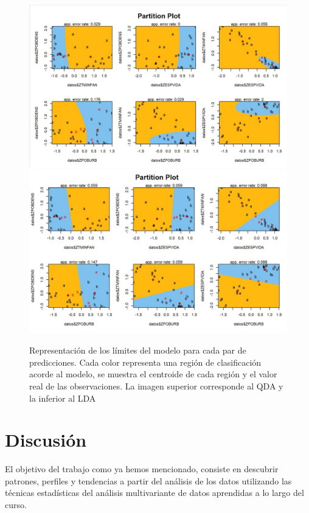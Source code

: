\documentclass[11pt,a4paper]{article}
\begin{document}
        \begin{figure}[H]
            \centering
            \includegraphics[scale=1]{img2.jpg}
            \includegraphics[scale=1]{img3.jpg}
            \caption{Representación de los límites del modelo para cada par de predicciones. Cada color representa una región de clasificación acorde al modelo, se muestra el centroide de cada región y el valor real de las observaciones. La imagen superior corresponde al QDA y la inferior al LDA }
            \label{img2}
        \end{figure}
        
    


        


	
	\section{Discusión}
	
    El objetivo del trabajo como ya hemos mencionado, consiste en descubrir patrones, perfiles y tendencias a partir del análisis de los datos utilizando las técnicas estadísticas del análisis multivariante de datos aprendidas a lo largo del curso. \\ 
    
\end{document}
